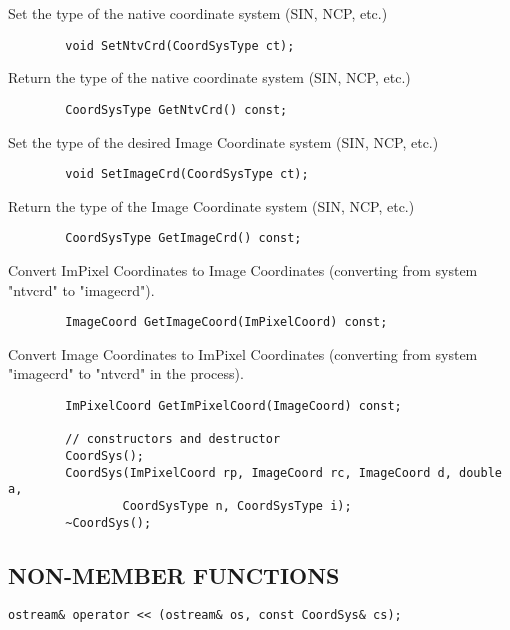            Set the type of the native coordinate system (SIN, NCP, etc.)
\begin{verbatim}
        void SetNtvCrd(CoordSysType ct);
\end{verbatim}

           Return the type of the native coordinate system (SIN, NCP, etc.)
\begin{verbatim}
        CoordSysType GetNtvCrd() const;
\end{verbatim}

           Set the type of the desired Image Coordinate system (SIN, NCP, etc.)
\begin{verbatim}
        void SetImageCrd(CoordSysType ct);
\end{verbatim}

           Return the type of the Image Coordinate system (SIN, NCP, etc.)
\begin{verbatim}
        CoordSysType GetImageCrd() const;
\end{verbatim}

           Convert ImPixel Coordinates to Image Coordinates (converting from
           system "ntvcrd" to "imagecrd").
\begin{verbatim}
        ImageCoord GetImageCoord(ImPixelCoord) const;
\end{verbatim}

           Convert Image Coordinates to ImPixel Coordinates (converting from
           system "imagecrd" to "ntvcrd" in the process).
\begin{verbatim}
        ImPixelCoord GetImPixelCoord(ImageCoord) const;

        // constructors and destructor
        CoordSys();
        CoordSys(ImPixelCoord rp, ImageCoord rc, ImageCoord d, double a,
                CoordSysType n, CoordSysType i);
        ~CoordSys();
\end{verbatim}

\subsection*{NON-MEMBER FUNCTIONS}

\begin{verbatim}
ostream& operator << (ostream& os, const CoordSys& cs);
\end{verbatim}
